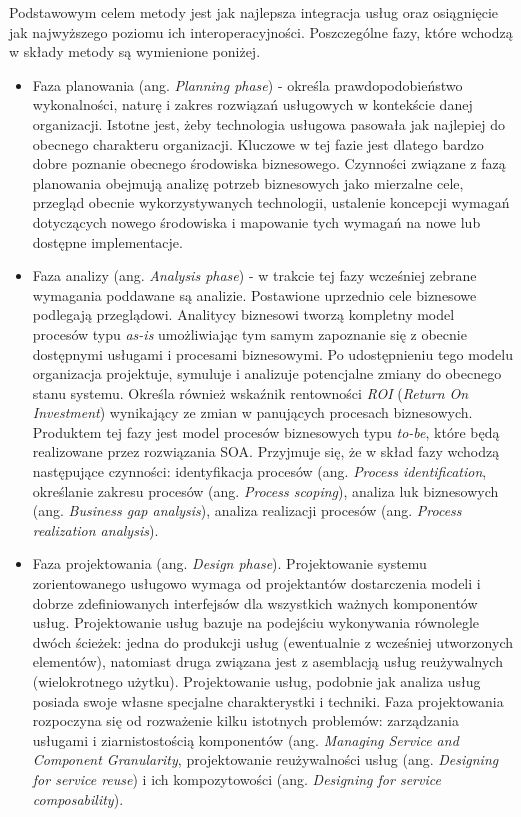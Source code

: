 Podstawowym celem metody jest jak najlepsza integracja usług oraz osiągnięcie jak najwyższego poziomu ich interoperacyjności. Poszczególne fazy, które wchodzą w składy metody są wymienione poniżej.
\begin{itemize}
\item{Faza planowania (ang. \emph{Planning phase}) - określa prawdopodobieństwo wykonalności, naturę i zakres rozwiązań usługowych w kontekście danej organizacji.  Istotne jest, żeby technologia usługowa pasowała jak najlepiej do obecnego charakteru organizacji. Kluczowe w tej fazie jest dlatego bardzo dobre poznanie obecnego środowiska biznesowego. Czynności związane z fazą planowania obejmują analizę potrzeb biznesowych jako mierzalne cele,  przegląd obecnie wykorzystywanych technologii, ustalenie koncepcji wymagań dotyczących nowego środowiska i mapowanie tych wymagań na nowe lub dostępne implementacje.}

\item{Faza analizy (ang. \emph{Analysis phase}) - w trakcie tej fazy wcześniej zebrane wymagania poddawane są analizie. Postawione uprzednio cele biznesowe podlegają przeglądowi. Analitycy biznesowi tworzą kompletny model procesów typu \emph{as-is} umożliwiając tym samym zapoznanie się z obecnie dostępnymi usługami i procesami biznesowymi. Po udostępnieniu tego modelu organizacja projektuje, symuluje i analizuje potencjalne zmiany do obecnego stanu systemu. Określa również wskaźnik rentowności \emph{ROI} (\emph{Return On Investment}) wynikający ze zmian w panujących procesach biznesowych. Produktem tej fazy jest model procesów biznesowych typu \emph{to-be}, które będą realizowane przez rozwiązania SOA. Przyjmuje się, że w skład fazy wchodzą następujące czynności: identyfikacja procesów (ang. \emph{Process identification}, określanie zakresu procesów (ang. \emph{Process scoping}), analiza luk biznesowych (ang. \emph{Business gap analysis}), analiza realizacji procesów (ang. \emph{Process realization analysis}).}

\item{Faza projektowania (ang. \emph{Design phase}).
Projektowanie systemu zorientowanego usługowo wymaga od projektantów dostarczenia modeli i dobrze zdefiniowanych interfejsów dla wszystkich ważnych komponentów usług. Projektowanie usług bazuje na podejściu wykonywania równolegle dwóch ścieżek: jedna do produkcji usług (ewentualnie z wcześniej utworzonych elementów), natomiast druga związana jest z asemblacją usług reużywalnych (wielokrotnego użytku). Projektowanie usług, podobnie jak analiza usług posiada swoje własne specjalne charakterystki i techniki. Faza projektowania rozpoczyna się od rozważenie kilku istotnych problemów: zarządzania usługami i ziarnistostością komponentów (ang. \emph{Managing Service and Component Granularity}, projektowanie reużywalności usług (ang. \emph{Designing for service reuse}) i ich kompozytowości (ang. \emph{Designing for service composability}).}


\end{itemize}
